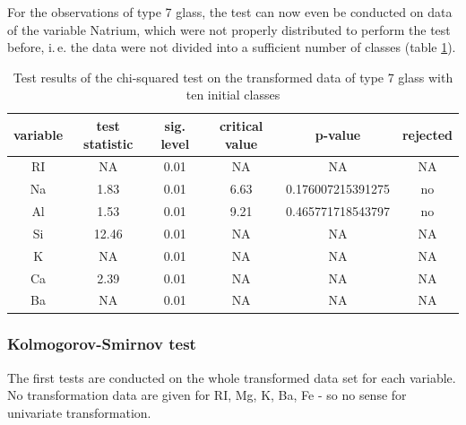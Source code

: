 \documentclass[a4paper, 12pt, titlepage, headsepline, listof = totoc, bibliography = totoc, numbers = noenddot]{scrartcl}
\newcommand{\ie}{i.\,e. }
\begin{document}
For the observations of type 7 glass, the test can now even be conducted on data of the variable Natrium, which were not properly distributed to perform the test before, \ie the data were not divided into a sufficient number of classes (table \ref{tab:chi-type7-trans}).

\begin{table}[h!]
\centering
\begin{tabular}{|cccccc|} \hline variable & test statistic & sig. level & critical value & p-value & rejected\\ \hline RI & NA & 0.01 & NA & NA & NA\\ 
Na & 1.83 & 0.01 & 6.63 & 0.176007215391275 & no\\ 
Al & 1.53 & 0.01 & 9.21 & 0.465771718543797 & no\\ 
Si & 12.46 & 0.01 & NA & NA & NA\\ 
K & NA & 0.01 & NA & NA & NA\\ 
Ca & 2.39 & 0.01 & NA & NA & NA\\ 
Ba & NA & 0.01 & NA & NA & NA\\ \hline \end{tabular}\caption{Test results of the chi-squared test on the transformed data of type 7 glass with ten initial classes}
\label{tab:chi-type7-trans}
\end{table}

\subsubsection{Kolmogorov-Smirnov test}

The first tests are conducted on the whole transformed data set for each
variable. No transformation data are given for RI, Mg, K, Ba, Fe - so no sense
for univariate transformation.

\end{document}

